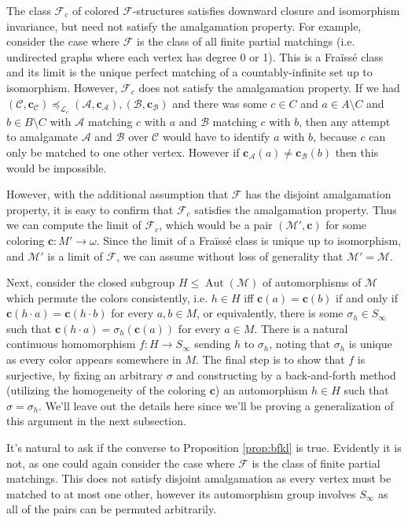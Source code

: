 \documentclass[12pt]{amsart}
\theoremstyle{plain}
\theoremstyle{definition}
\newcommand{\mcA}{\mathcal{A}}
\newcommand{\mcB}{\mathcal{B}}
\newcommand{\mcC}{\mathcal{C}}
\newcommand{\mcF}{\mathcal{F}}
\newcommand{\mcL}{\mathcal{L}}
\newcommand{\mcM}{\mathcal{M}}
\newcommand{\oc}{\mathbf{c}}
\DeclareMathOperator{\Aut}{Aut}
\begin{document}
The class $\mcF_c$ of colored $\mcF$-structures satisfies downward closure and isomorphism invariance, but need not satisfy the amalgamation property.
For example, consider the case where $\mcF$ is the class of all finite partial matchings (i.e. undirected graphs where each vertex has degree 0 or 1).
This is a Fra\"{i}ss\'{e} class and its limit is the unique perfect matching of a countably-infinite set up to isomorphism.
However, $\mcF_c$ does not satisfy the amalgamation property.
If we had $(\mcC, \oc_\mcC) \preceq_{\mcL_c} (\mcA, \oc_\mcA), (\mcB, \oc_\mcB)$ and there was some $c \in C$ and $a \in A \setminus C$ and $b \in B \setminus C$ with $\mcA$ matching $c$ with $a$ and $\mcB$ matching $c$ with $b$, then any attempt to amalgamate $\mcA$ and $\mcB$ over $\mcC$ would have to identify $a$ with $b$, because $c$ can only be matched to one other vertex.
However if $\oc_\mcA(a) \neq \oc_\mcB(b)$ then this would be impossible.

However, with the additional assumption that $\mcF$ has the disjoint amalgamation property, it is easy to confirm that $\mcF_c$ satisfies the amalgamation property.
Thus we can compute the limit of $\mcF_c$, which would be a pair $(\mcM', \oc)$ for some coloring $\oc : M' \rightarrow \omega$.
Since the limit of a Fra\"{i}ss\'{e} class is unique up to isomorphism, and $\mcM'$ is a limit of $\mcF$, we can assume without loss of generality that $\mcM' = \mcM$.

Next, consider the closed subgroup $H \le \Aut(\mcM)$ of automorphisms of $\mcM$ which permute the colors consistently, i.e. $h \in H$ iff $\oc(a) = \oc(b)$ if and only if $\oc(h \cdot a) = \oc(h \cdot b)$ for every $a, b \in M$, or equivalently, there is some $\sigma_h \in S_\infty$ such that $\oc(h \cdot a) = \sigma_h(\oc(a))$ for every $a \in M$.
There is a natural continuous homomorphism $f : H \rightarrow S_\infty$ sending $h$ to $\sigma_h$, noting that $\sigma_h$ is unique as every color appears somewhere in $M$.
The final step is to show that $f$ is surjective, by fixing an arbitrary $\sigma$ and constructing by a back-and-forth method (utilizing the homogeneity of the coloring $\oc$) an automorphism $h \in H$ such that $\sigma = \sigma_h$.
We'll leave out the details here since we'll be proving a generalization of this argument in the next subsection.

It's natural to ask if the converse to Proposition \ref{prop:bfkl} is true.
Evidently it is not, as one could again consider the case where $\mcF$ is the class of finite partial matchings.
This does not satisfy disjoint amalgamation as every vertex must be matched to at most one other, however its automorphism group involves $S_\infty$ as all of the pairs can be permuted arbitrarily.
\end{document}
